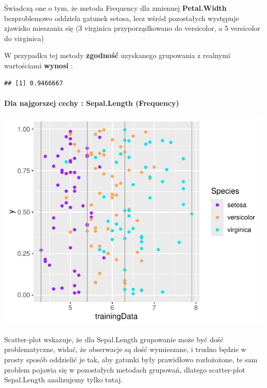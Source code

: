 \documentclass[
  12pt,
]{article}
\begin{document}
Świadczą one o tym, że metoda Frequency dla zmiennej
\textbf{Petal.Width} bezproblemowo oddziela gatunek setosa, lecz wśród
pozostałych występuje zjawisko mieszania się (3 virginica
przyporządkowano do versicolor, a 5 versicolor do virginica)

W przypadku tej metody \textbf{zgodność} uzyskanego grupowania z
realnymi wartościami \textbf{wynosi} :

\begin{verbatim}
## [1] 0.9466667
\end{verbatim}

\paragraph{Dla najgorszej cechy : Sepal.Length
(Frequency)}\label{dla-najgorszej-cechy-sepal.length-frequency}

\begin{center}\includegraphics{Sprawozdanie2_files/figure-latex/frequences_najg-1} \end{center}

Scatter-plot wskazuje, że dla Sepal.Length grupowanie może być dość
problematyczne, widać, że obserwacje są dość wymieszane, i trudno będzie
w prosty sposób oddzielić je tak, aby gatunki były prawidłowo
rozłożożone, te sam problem pojawia się w pozostałych metodach grupowań,
dlatego scatter-plot Sepal.Length analizujemy tylko tutaj.
\end{document}
